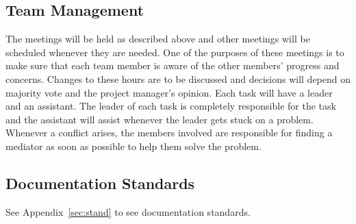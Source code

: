 \subsection{Team Management}

The meetings will be held as described above and other meetings will be
scheduled whenever they are needed. One of the purposes of these meetings is to
make sure that each team member is aware of the other members' progress and
concerns. Changes to these hours are to be discussed and decisions will depend
on majority vote and the project manager's opinion. Each task will have a leader
and an assistant. The leader of each task is completely responsible for the task
and the assistant will assist whenever the leader gets stuck on a problem.
Whenever a conflict arises, the members involved are responsible for finding a
mediator as soon as possible to help them solve the problem.

\subsection{Documentation Standards}
See Appendix~\ref{sec:stand} to see documentation standards.
